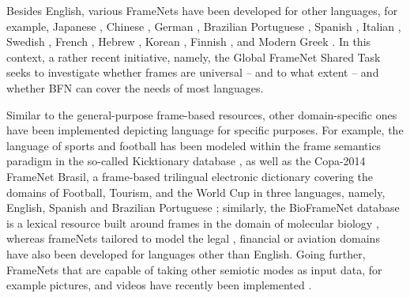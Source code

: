 \documentclass[output=paper,colorlinks,citecolor=brown]{langscibook}
\begin{document}
Besides English, various FrameNets have been developed for other languages, for example, Japanese \citep{ohara_etal_2003, saito_etal_2008}, Chinese \citep{you_liu_2005}, German \citep{erk-etal-2003-towards, boas_2002}, Brazilian Portuguese \citep{Salomão2009, TorrentEllsworth2013}, Spanish \citep{suribats_2009}, Italian \citep{lenci_etal_2010}, Swedish \citep{borin_etal_2010}, French \citep{candito_etal_2014}, Hebrew \citep{hayoun_elhadad_2016}, Korean \citep{kim_etal_2016}, Finnish \citep{Linden_etal_2017}, and Modern Greek \citep{giouli_etal_2020, pilitsidou_giouli_2020}. In this context, a rather recent initiative, namely, the Global FrameNet Shared Task \citep{Torrent_etal_2018} seeks to investigate whether frames are universal – and to what extent – and whether BFN can cover the needs of most languages.


Similar to the general-purpose frame-based resources, other domain-specific ones have been implemented depicting language for specific purposes. For example, the language of sports and football has been modeled within the frame semantics paradigm in the so-called Kicktionary database \citep{schmidt_kicktionary_2009}, as well as the Copa-2014 FrameNet Brasil, a frame-based trilingual electronic dictionary covering the domains of Football, Tourism, and the World Cup in three languages, namely, English, Spanish and Brazilian Portuguese \citep{torrent-etal-2014-copa}; similarly, the BioFrameNet database is a lexical resource built around frames in the domain of molecular biology \citep{DolbeyES06}, whereas frameNets tailored to model the legal \citep{Venturi2009}, financial \citep{pilitsidou_giouli_2020} or aviation \citep{ostroski2022} domains have also been developed for languages other than English. Going further, FrameNets that are capable of taking other semiotic modes as input data, for example pictures, and videos have recently been implemented \citep{torrent_etal_2022}.
\end{document}
